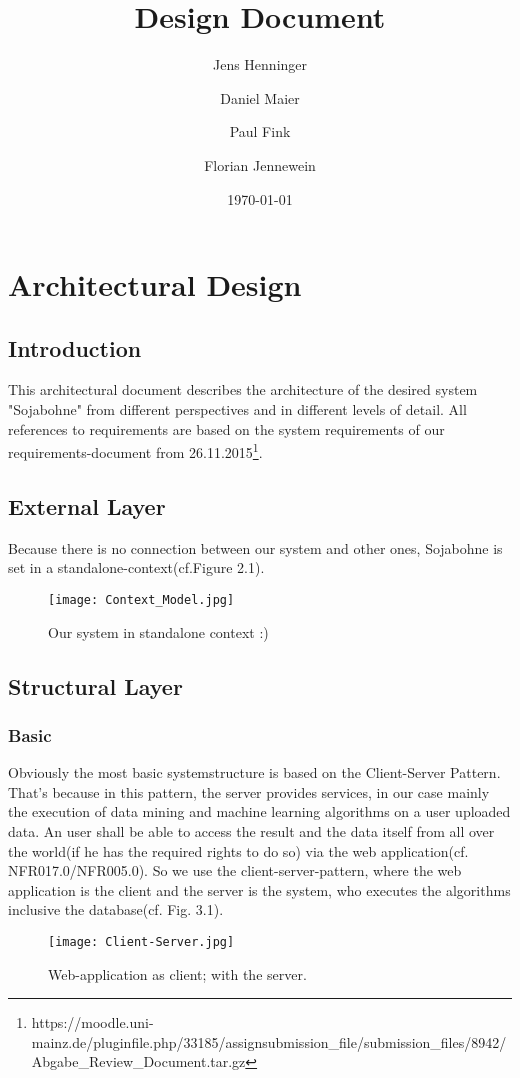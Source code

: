 \documentclass{book}
\title{Design Document}
\author{Jens Henninger \and Daniel Maier \and Paul Fink \and Florian Jennewein}
\date{\today}
\begin{document}
\frontmatter
\maketitle
\tableofcontents
\mainmatter
\part{Architectural Design}

\chapter{Introduction}
This architectural document describes the architecture of the desired system 
"Sojabohne" from different perspectives and in different levels of detail. 
All references to requirements are based on the system requirements of our requirements-document from 26.11.2015\footnote{https://moodle.uni-mainz.de/pluginfile.php/33185/assignsubmission\_file/submission\_files/8942/Abgabe\_Review\_Document.tar.gz}.
\chapter{External Layer}
Because there is no connection between our system and other ones,
 Sojabohne is set in a standalone-context(cf.Figure 2.1). 
\begin{figure}[H]
\centering
\texttt{[image: Context\_Model.jpg]}
\caption{Our system in standalone context :)}
\label{Fig. 1}
\end{figure}
\chapter{Structural Layer}
\section{Basic}
Obviously the most basic systemstructure is based on the Client-Server Pattern.
That's because in this pattern, the server provides services, in our case mainly
the execution of data mining and machine learning algorithms on a user uploaded data.
An user shall be able to access the result and the data itself from all over the
world(if he has the required rights to do so) via the web application(cf. NFR017.0/NFR005.0). 
So we use the client-server-pattern, where the web application is the client and the server
is the system, who executes the algorithms inclusive the database(cf. Fig. 3.1).
\begin{figure}[H]
\centering
\texttt{[image: Client-Server.jpg]}
\caption{Web-application as client; with the server.}
\label{Fig. 2}
\end{figure}
\end{document}
